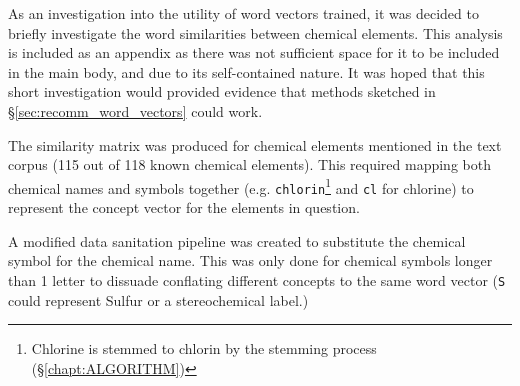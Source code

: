 As an investigation into the utility of word vectors trained, it was decided to briefly investigate the word similarities between chemical elements. This analysis is included as an appendix as there was not sufficient space for it to be included in the main body, and due to its self-contained nature. It was hoped that this short investigation would provided evidence that methods sketched in \S\ref{sec:recomm_word_vectors} could work.

The similarity matrix was produced for chemical elements mentioned in the text corpus (115 out of 118 known chemical elements). This required mapping both chemical names and symbols together (e.g. \texttt{chlorin}\footnote{Chlorine is stemmed to chlorin by the stemming process (\S\ref{chapt:ALGORITHM}) }  and \texttt{cl} for chlorine) to represent the concept vector for the elements in question.

A modified data sanitation pipeline was created to substitute the chemical symbol for the chemical name. This was only done for chemical symbols longer than 1 letter to dissuade conflating different concepts to the same word vector (\texttt{S} could represent Sulfur or a stereochemical label.)
 

